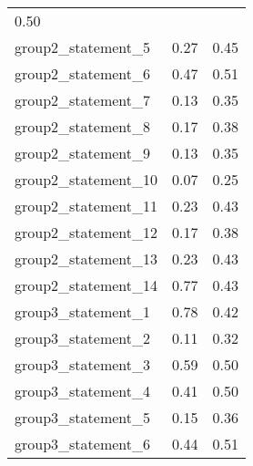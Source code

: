 \documentclass{article}
\begin{document}
\begin{table}[!h]
\begin{tabular}{lll}
  \multicolumn{1}{|l|}{0.50} \\
\cline{1-3}
\multicolumn{1}{|l}{group2\_statement\_5} &
  \multicolumn{1}{|l}{0.27} &
  \multicolumn{1}{|l|}{0.45} \\
\cline{1-3}
\multicolumn{1}{|l}{group2\_statement\_6} &
  \multicolumn{1}{|l}{0.47} &
  \multicolumn{1}{|l|}{0.51} \\
\cline{1-3}
\multicolumn{1}{|l}{group2\_statement\_7} &
  \multicolumn{1}{|l}{0.13} &
  \multicolumn{1}{|l|}{0.35} \\
\cline{1-3}
\multicolumn{1}{|l}{group2\_statement\_8} &
  \multicolumn{1}{|l}{0.17} &
  \multicolumn{1}{|l|}{0.38} \\
\cline{1-3}
\multicolumn{1}{|l}{group2\_statement\_9} &
  \multicolumn{1}{|l}{0.13} &
  \multicolumn{1}{|l|}{0.35} \\
\cline{1-3}
\multicolumn{1}{|l}{group2\_statement\_10} &
  \multicolumn{1}{|l}{0.07} &
  \multicolumn{1}{|l|}{0.25} \\
\cline{1-3}
\multicolumn{1}{|l}{group2\_statement\_11} &
  \multicolumn{1}{|l}{0.23} &
  \multicolumn{1}{|l|}{0.43} \\
\cline{1-3}
\multicolumn{1}{|l}{group2\_statement\_12} &
  \multicolumn{1}{|l}{0.17} &
  \multicolumn{1}{|l|}{0.38} \\
\cline{1-3}
\multicolumn{1}{|l}{group2\_statement\_13} &
  \multicolumn{1}{|l}{0.23} &
  \multicolumn{1}{|l|}{0.43} \\
\cline{1-3}
\multicolumn{1}{|l}{group2\_statement\_14} &
  \multicolumn{1}{|l}{0.77} &
  \multicolumn{1}{|l|}{0.43} \\
\cline{1-3}
\multicolumn{1}{|l}{group3\_statement\_1} &
  \multicolumn{1}{|l}{0.78} &
  \multicolumn{1}{|l|}{0.42} \\
\cline{1-3}
\multicolumn{1}{|l}{group3\_statement\_2} &
  \multicolumn{1}{|l}{0.11} &
  \multicolumn{1}{|l|}{0.32} \\
\cline{1-3}
\multicolumn{1}{|l}{group3\_statement\_3} &
  \multicolumn{1}{|l}{0.59} &
  \multicolumn{1}{|l|}{0.50} \\
\cline{1-3}
\multicolumn{1}{|l}{group3\_statement\_4} &
  \multicolumn{1}{|l}{0.41} &
  \multicolumn{1}{|l|}{0.50} \\
\cline{1-3}
\multicolumn{1}{|l}{group3\_statement\_5} &
  \multicolumn{1}{|l}{0.15} &
  \multicolumn{1}{|l|}{0.36} \\
\cline{1-3}
\multicolumn{1}{|l}{group3\_statement\_6} &
  \multicolumn{1}{|l}{0.44} &
  \multicolumn{1}{|l|}{0.51} \\

\end{tabular}
\end{table}
\end{document}
